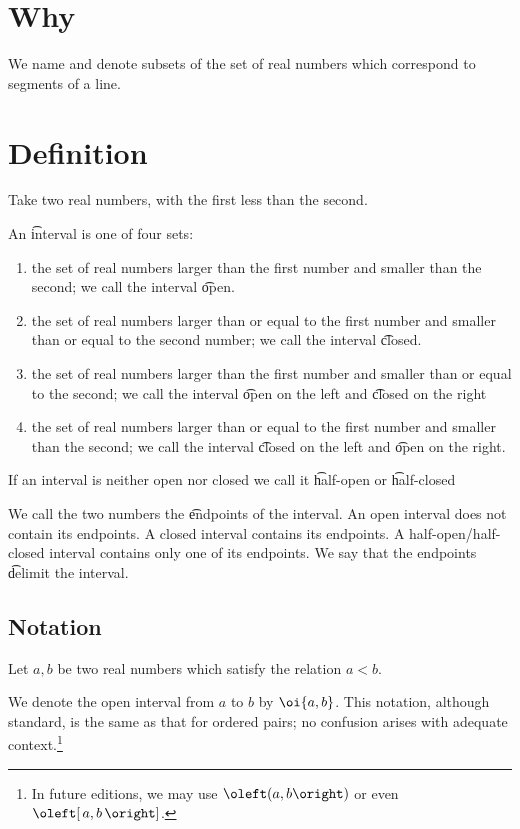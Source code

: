 
\section*{Why}

We name and denote subsets of the set of real numbers which correspond to segments of a line.

\section*{Definition}

Take two real numbers, with the first less than the second.

An \t{interval} is one of four sets:
    \begin{enumerate}
      \item the set of real numbers larger than the first number and smaller than the second; we call the interval \t{open}.
      \item the set of real numbers larger than or equal to the first number and smaller than or equal to the second number; we call the interval \t{closed}.
      \item the set of real numbers larger than the first number and smaller than or equal to the second; we call the interval \t{open on the left} and \t{closed on the right}
      \item the set of real numbers larger than or equal to the first number and smaller than the second; we call the interval \t{closed on the left} and \t{open on the right}.
    \end{enumerate}
If an interval is neither open nor closed we call it \t{half-open} or \t{half-closed}

We call the two numbers the \t{endpoints} of the interval.
An open interval does not contain its endpoints.
A closed interval contains its endpoints.
A half-open/half-closed interval contains only one of its endpoints.
We say that the endpoints \t{delimit} the interval.

\subsection*{Notation}

Let $a, b$ be two real numbers which satisfy the relation $a < b$.

We denote the open interval from $a$ to $b$ by $\oi{a, b}$.
This notation, although standard, is the same as that for ordered pairs; no confusion arises with adequate context.\footnote{In future editions, we may use $\oleft(a, b\oright)$ or even $\oleft[\,a, b\,\oright]$.}

